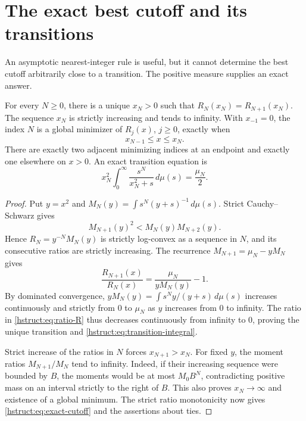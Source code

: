 \section{The exact best cutoff and its transitions}
\label{hstruct:sec:cutoff}

An asymptotic nearest-integer rule is useful, but it cannot determine
the best cutoff arbitrarily close to a transition. The positive
measure supplies an exact answer.

\begin{theorem}
\label{hstruct:thm:transitions}
For every $N\ge0$, there is a unique $x_N>0$ such that
$R_N(x_N)=R_{N+1}(x_N)$. The sequence $x_N$ is strictly increasing
and tends to infinity. With $x_{-1}=0$, the index $N$ is a global
minimizer of $R_j(x)$, $j\ge0$, exactly when
\begin{equation}\label{hstruct:eq:exact-cutoff}
 x_{N-1}\le x\le x_N.
\end{equation}
There are exactly two adjacent minimizing indices at an endpoint
and exactly one elsewhere on $x>0$. An exact transition equation is
\begin{equation}\label{hstruct:eq:transition-integral}
 x_N^2\int_0^\infty\frac{s^N}{x_N^2+s}\,d\mu(s)=\frac{\mu_N}2.
\end{equation}
\end{theorem}
\begin{proof}
Put $y=x^2$ and
$M_N(y)=\int s^N(y+s)^{-1}\,d\mu(s)$.
Strict Cauchy--Schwarz gives
\[
 M_{N+1}(y)^2<M_N(y)M_{N+2}(y).
\]
Hence $R_N=y^{-N}M_N(y)$ is strictly log-convex as a sequence in
$N$, and its consecutive ratios are strictly increasing.
The recurrence $M_{N+1}=\mu_N-yM_N$ gives
\begin{equation}\label{hstruct:eq:ratio-R}
 \frac{R_{N+1}(x)}{R_N(x)}
 =\frac{\mu_N}{yM_N(y)}-1.
\end{equation}
By dominated convergence,
$yM_N(y)=\int s^N y/(y+s)\,d\mu(s)$ increases continuously and
strictly from $0$ to $\mu_N$ as $y$ increases from $0$ to infinity.
The ratio in \eqref{hstruct:eq:ratio-R} thus decreases continuously from
infinity to $0$, proving the unique transition and
\eqref{hstruct:eq:transition-integral}.

Strict increase of the ratios in $N$ forces $x_{N+1}>x_N$.
For fixed $y$, the moment ratios $M_{N+1}/M_N$ tend to infinity.
Indeed, if their increasing sequence were bounded by $B$, the
moments would be at most $M_0B^N$, contradicting positive mass on
an interval strictly to the right of $B$. This also proves
$x_N\to\infty$ and existence of a global minimum. The strict ratio
monotonicity now gives \eqref{hstruct:eq:exact-cutoff} and the assertions
about ties.
\end{proof}

